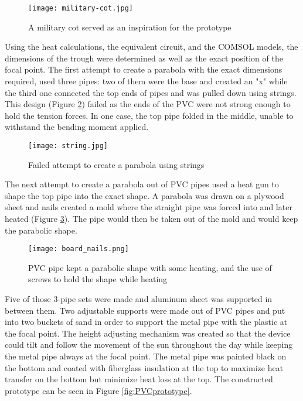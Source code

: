 \documentclass[11pt,english]{article}
\begin{document}
\begin{figure}[ht!]
\centering
\texttt{[image: military-cot.jpg]}
\caption{A military cot served as an inspiration for the prototype}
\label{fig:milcot}
\end{figure}
\newpage
\noindent Using the heat calculations, the equivalent circuit, and the COMSOL models, the dimensions of the trough were determined as well as the exact position of the focal point. The first attempt to create a parabola with the exact dimensions required, used three pipes: two of them were the base and created an "x" while the third one connected the top ends of pipes and was pulled down using strings. This design (Figure \ref{fig:strings}) failed as the ends of the PVC were not strong enough to hold the tension forces. In one case, the top pipe folded in the middle, unable to withstand the bending moment applied.
\begin{figure}[ht!]
\centering
\texttt{[image: string.jpg]}
\caption{Failed attempt to create a parabola using strings}
\label{fig:strings}
\end{figure}
\newpage
\noindent The next attempt to create a parabola out of PVC pipes used a heat gun to shape the top pipe into the exact shape. A parabola was drawn on a plywood sheet and nails created a mold where the straight pipe was forced into and later heated (Figure \ref{fig:board}). The pipe would then be taken out of the mold and would keep the parabolic shape. 

\begin{figure}[ht!]
\centering
\texttt{[image: board\_nails.png]}
\caption{PVC pipe kept a parabolic shape with some heating, and the use of screws to hold the shape while heating}
\label{fig:board}
\end{figure}
\newpage
\noindent Five of those 3-pipe sets were made and aluminum sheet was supported in between them. Two adjustable supports were made out of PVC pipes and put into two buckets of sand in order to support the metal pipe with the plastic at the focal point. The height adjusting mechanism was created so that the device could tilt and follow the movement of the sun throughout the day while keeping the metal pipe always at the focal point. The metal pipe was painted black on the bottom and coated with fiberglass insulation at the top to maximize heat transfer on the bottom but minimize heat loss at the top. The constructed prototype can be seen in Figure \ref{fig:PVCprototype}.\\
\end{document}
